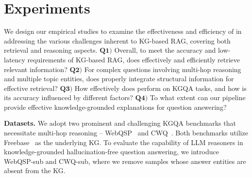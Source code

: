 \section{Experiments}

We design our empirical studies to examine the effectiveness and efficiency of \proj in addressing the various challenges inherent to KG-based RAG, covering both retrieval and reasoning aspects. $\textbf{Q1})$ Overall, to meet the accuracy and low-latency requirements of KG-based RAG, does \proj effectively and efficiently retrieve relevant information? $\textbf{Q2})$ For complex questions involving multi-hop reasoning and multiple topic entities, does \proj properly integrate structural information for effective retrieval? 
$\textbf{Q3})$ How effectively does \proj perform on KGQA tasks, and how is its accuracy influenced by different factors?
$\textbf{Q4})$ To what extent can our pipeline provide effective knowledge-grounded explanations for question answering?

\textbf{Datasets.} We adopt two prominent and challenging KGQA benchmarks that necessitate multi-hop reasoning -- WebQSP~\citep{yih-etal-2016-value} and CWQ~\citep{talmor-berant-2018-web}. Both benchmarks utilize Freebase~\citep{10.1145/1376616.1376746} as the underlying KG. To evaluate the capability of LLM reasoners in knowledge-grounded hallucination-free question answering, we introduce WebQSP-sub and CWQ-sub, where we remove samples whose answer entities are absent from the KG.

